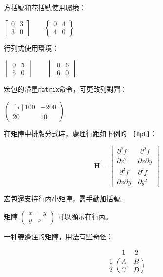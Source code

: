方括號和花括號使用環境：
\begin{codeshow}
\centering $\begin{bmatrix}
0 & 3 \\ 3 & 0 \end{bmatrix}\qquad
\begin{Bmatrix} 0 & 4 \\
4 & 0 \end{Bmatrix}$
\end{codeshow}

行列式使用環境：
\begin{codeshow}
\centering $\begin{vmatrix}
0 & 5 \\ 5 & 0 \end{vmatrix}\qquad
\begin{Vmatrix} 0 & 6 \\
6 & 0 \end{Vmatrix}$
\end{codeshow}

宏包的帶星\texttt{matrix}命令，可更改列對齊：
\begin{codeshow}
$\begin{pmatrix*}[r]
100 & -200 \\ 20 & 10
\end{pmatrix*}$
\end{codeshow}

在矩陣中排版分式時，處理行距如下例的 \texttt{ [8pt]}：
\begin{codeshow}
\[\mathbf{H}=\begin{bmatrix}
\dfrac{\partial^2 f}{\partial x^2} &
\dfrac{\partial^2 f}
{\partial x \partial y} \\[8pt]
\dfrac{\partial^2 f}
{\partial x \partial y} &
\dfrac{\partial^2 f}{\partial y^2}
\end{bmatrix}\]
\end{codeshow}

宏包還支持行內小矩陣，需手動加括號。
\begin{codeshow}
矩陣 $\left(\begin{smallmatrix}
x & -y\\ y & x\end{smallmatrix}
\right)$ 可以顯示在行內。
\end{codeshow}

一種帶邊注的矩陣，用法有些奇怪：
\begin{codeshow}
\[\bordermatrix{& 1 & 2\cr
1 & A & B \cr
2 & C & D \cr} \]
\end{codeshow}

